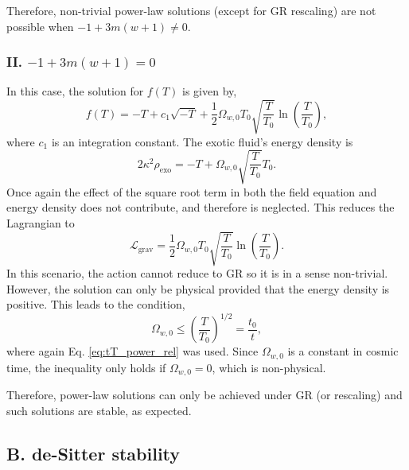 \documentclass[prl,floatfix,showpacs,twocolumn,preprintnumbers,amsmath,amssymb,superscriptaddress]{revtex4}
\begin{document}
Therefore, non-trivial power-law solutions (except for GR rescaling) are not possible when $-1+3 m (w+1) \neq 0$. 

\subsubsection{II. $-1+3 m (w+1) = 0$}

In this case, the solution for $f(T)$ is given by,
\begin{equation}
f(T) = -T + c_1 \sqrt{-T}+\frac{1}{2} \Omega_{w,0} T_0 \sqrt{\frac{T}{T_0}} \ln \left(\frac{T}{T_0}\right),
\end{equation}
where $c_1$ is an integration constant. The exotic fluid's energy density is 
\begin{equation}
2\kappa^2 \rho_{\text{exo}} = -T + \Omega_{w,0} \sqrt{\frac{T}{T_0}} T_0.
\end{equation}
Once again the effect of the square root term in both the field equation and energy density does not contribute, and therefore is neglected. This reduces the Lagrangian to
\begin{equation}
\mathcal{L}_{\text{grav}} = \frac{1}{2} \Omega_{w,0} T_0 \sqrt{\frac{T}{T_0}} \ln \left(\frac{T}{T_0}\right).
\end{equation}
In this scenario, the action cannot reduce to GR so it is in a sense non-trivial. However, the solution can only be physical provided that the energy density is positive. This leads to the condition, 
\begin{equation}
\Omega_{w,0} \leq \left(\frac{T}{T_0}\right)^{1/2} = \frac{t_0}{t},
\end{equation}
where again Eq. \eqref{eq:tT_power_rel} was used. Since $\Omega_{w,0}$ is a constant in cosmic time, the inequality only holds if $\Omega_{w,0} = 0$, which is non-physical. 

Therefore, power-law solutions can only be achieved under GR (or rescaling) and such solutions are stable, as expected. 

\subsection{B. de-Sitter stability}
\end{document}

